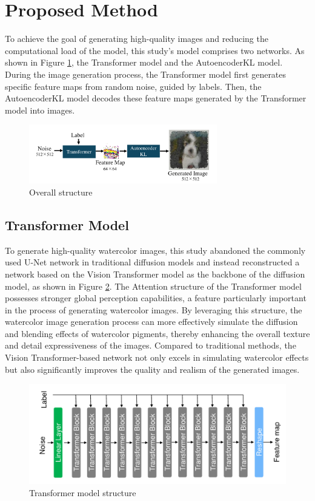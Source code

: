 \documentclass{acsman}
\begin{document}
\section{Proposed Method}\label{sec:method}
To achieve the goal of generating high-quality images and reducing the computational load of the model, this study's model comprises two networks. As shown in Figure \ref{fig:overall}, the Transformer model and the AutoencoderKL model. During the image generation process, the Transformer model first generates specific feature maps from random noise, guided by labels. Then, the AutoencoderKL model decodes these feature maps generated by the Transformer model into images.

\begin{figure}[H]
    \centering
    \includegraphics[width=8.2cm]{image/overall.pdf}
    \caption{Overall structure}
    \label{fig:overall}
\end{figure}

\subsection{Transformer Model}
To generate high-quality watercolor images, this study abandoned the commonly used U-Net network in traditional diffusion models and instead reconstructed a network based on the Vision Transformer model as the backbone of the diffusion model, as shown in Figure \ref{fig:traM}. The Attention structure of the Transformer model possesses stronger global perception capabilities, a feature particularly important in the process of generating watercolor images. By leveraging this structure, the watercolor image generation process can more effectively simulate the diffusion and blending effects of watercolor pigments, thereby enhancing the overall texture and detail expressiveness of the images. Compared to traditional methods, the Vision Transformer-based network not only excels in simulating watercolor effects but also significantly improves the quality and realism of the generated images.
\begin{figure}[tbp]
    \centering
    \includegraphics[width=16cm]{image/traM.pdf}
    \caption{Transformer model structure}
    \label{fig:traM}
\end{figure}
\end{document}
